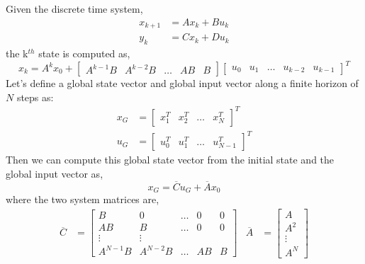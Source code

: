 \documentclass{article}
\newcommand{\doublebar}[1]{\overline{#1}}
\begin{document}
Given the discrete time system,
\begin{align}
    x_{k+1} &= Ax_k + Bu_k \\
    y_k &= Cx_k + Du_k
\end{align}
the k$^{th}$ state is computed as,
\begin{equation}
    x_k = A^kx_0 + \begin{bmatrix} A^{k-1}B & A^{k-2}B & \ldots & AB & B \end{bmatrix}
        \begin{bmatrix} u_0 & u_1 & \ldots & u_{k-2} & u_{k-1} \end{bmatrix}^T
\end{equation}
Let's define a global state vector and global input vector along a finite horizon of $N$ steps as:
\begin{align}
    x_G &= \begin{bmatrix} x_1^T & x_2^T & \ldots & x_N^T \end{bmatrix}^T
    \label{eq:global-state} \\
    u_G &= \begin{bmatrix} u_0^T & u_1^T & \ldots & u_{N-1}^T \end{bmatrix}^T
    \label{eq:global-input}
\end{align}
Then we can compute this global state vector from the initial state and the global input vector as,
\begin{equation}
    x_G = \doublebar{C}u_G + \doublebar{A}x_0
    \label{eq:global-system}
\end{equation}
where the two system matrices are,
\begin{align}
    \doublebar{C} &= \begin{bmatrix}
        B         & 0        & \ldots & 0      & 0 \\
        AB        & B        & \ldots & 0      & 0 \\
        \vdots    & \vdots   &        &        &   \\
         A^{N-1}B & A^{N-2}B & \ldots & AB     & B
    \end{bmatrix} &
    \doublebar{A} &= \begin{bmatrix}
        A \\ A^2 \\ \vdots \\ A^N
    \end{bmatrix}
\end{align}
\end{document}
